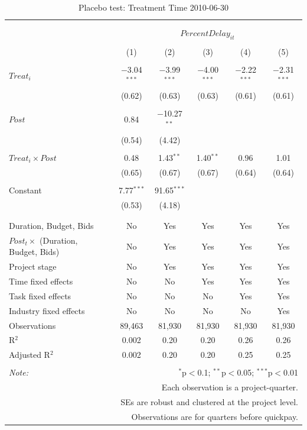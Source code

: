 \documentclass[
]{article}
\begin{document}
\begin{table}[H] \centering 
  \caption{Placebo test: Treatment Time 2010-06-30} 
  \label{} 
\small 
\begin{tabular}{@{\extracolsep{-2pt}}lccccc} 
\\[-1.8ex]\hline 
\hline \\[-1.8ex] 
\\[-1.8ex] & \multicolumn{5}{c}{$PercentDelay_{it}$} \\ 
\\[-1.8ex] & (1) & (2) & (3) & (4) & (5)\\ 
\hline \\[-1.8ex] 
 $Treat_i$ & $-$3.04$^{***}$ & $-$3.99$^{***}$ & $-$4.00$^{***}$ & $-$2.22$^{***}$ & $-$2.31$^{***}$ \\ 
  & (0.62) & (0.63) & (0.63) & (0.61) & (0.61) \\ 
  & & & & & \\ 
 $Post$ & 0.84 & $-$10.27$^{**}$ &  &  &  \\ 
  & (0.54) & (4.42) &  &  &  \\ 
  & & & & & \\ 
 $Treat_i \times Post$ & 0.48 & 1.43$^{**}$ & 1.40$^{**}$ & 0.96 & 1.01 \\ 
  & (0.65) & (0.67) & (0.67) & (0.64) & (0.64) \\ 
  & & & & & \\ 
 Constant & 7.77$^{***}$ & 91.65$^{***}$ &  &  &  \\ 
  & (0.53) & (4.18) &  &  &  \\ 
  & & & & & \\ 
\hline \\[-1.8ex] 
Duration, Budget, Bids & No & Yes & Yes & Yes & Yes \\ 
$Post_t \times$  (Duration, Budget, Bids) & No & Yes & Yes & Yes & Yes \\ 
Project stage & No & Yes & Yes & Yes & Yes \\ 
Time fixed effects & No & No & Yes & Yes & Yes \\ 
Task fixed effects & No & No & No & Yes & Yes \\ 
Industry fixed effects & No & No & No & No & Yes \\ 
Observations & 89,463 & 81,930 & 81,930 & 81,930 & 81,930 \\ 
R$^{2}$ & 0.002 & 0.20 & 0.20 & 0.26 & 0.26 \\ 
Adjusted R$^{2}$ & 0.002 & 0.20 & 0.20 & 0.25 & 0.25 \\ 
\hline 
\hline \\[-1.8ex] 
\textit{Note:}  & \multicolumn{5}{r}{$^{*}$p$<$0.1; $^{**}$p$<$0.05; $^{***}$p$<$0.01} \\ 
 & \multicolumn{5}{r}{Each observation is a project-quarter.} \\ 
 & \multicolumn{5}{r}{SEs are robust and clustered at the project level.} \\ 
 & \multicolumn{5}{r}{Observations are for quarters before quickpay.} \\ 
\end{tabular} 
\end{table}
\end{document}
